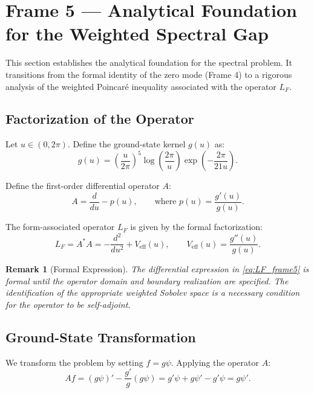\documentclass[12pt,a4paper]{article}
\newtheorem{remark}{Remark}
\begin{document}
\section{Frame 5 — Analytical Foundation for the Weighted Spectral Gap}\label{sec:frame5}

This section establishes the analytical foundation for the spectral problem. It transitions from the formal identity of the zero mode (Frame 4) to a rigorous analysis of the weighted Poincaré inequality associated with the operator \(L_F\).

\subsection{Factorization of the Operator}\label{subsec:5.1}

Let \(u \in (0, 2\pi)\). Define the ground-state kernel \(g(u)\) as:
\begin{equation}\label{eq:g_frame5}
g(u) = \left(\frac{u}{2\pi}\right)^5 \log\left(\frac{2\pi}{u}\right) \exp\left(-\frac{2\pi}{21u}\right).
\end{equation}

Define the first-order differential operator \(A\):
\begin{equation}\label{eq:A_frame5}
A = \frac{d}{du} - p(u), \qquad \text{where } p(u) = \frac{g'(u)}{g(u)}.
\end{equation}

The form-associated operator \(L_F\) is given by the formal factorization:
\begin{equation}\label{eq:LF_frame5}
L_F = A^* A = -\frac{d^2}{du^2} + V_{\text{eff}}(u), \qquad V_{\text{eff}}(u) = \frac{g''(u)}{g(u)}.
\end{equation}

\begin{remark}[Formal Expression]
The differential expression in \eqref{eq:LF_frame5} is formal until the operator domain and boundary realization are specified. The identification of the appropriate weighted Sobolev space is a necessary condition for the operator to be self-adjoint.
\end{remark}

\subsection{Ground-State Transformation}\label{subsec:5.2}

We transform the problem by setting \(f = g\psi\). Applying the operator \(A\):
\begin{equation}\label{eq:Af}
Af = (g\psi)' - \frac{g'}{g}(g\psi) = g'\psi + g\psi' - g'\psi = g\psi'.
\end{equation}
\end{document}
